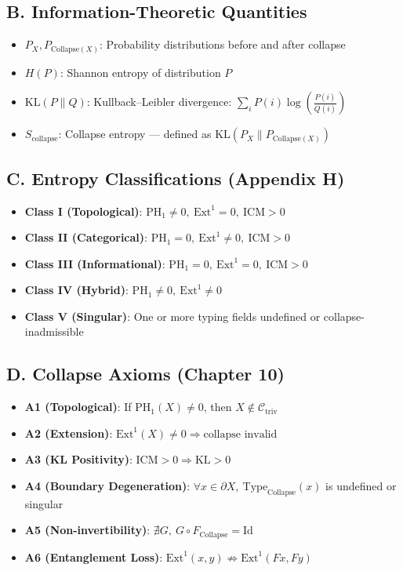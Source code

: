 \documentclass[11pt]{article}
\begin{document}
\subsection*{B. Information-Theoretic Quantities}

\begin{itemize}
  \item \( P_X, P_{\mathrm{Collapse}(X)} \): Probability distributions before and after collapse
  \item \( H(P) \): Shannon entropy of distribution \( P \)
  \item \( \mathrm{KL}(P \parallel Q) \): Kullback–Leibler divergence: \( \sum_i P(i) \log \left( \frac{P(i)}{Q(i)} \right) \)
  \item \( S_{\mathrm{collapse}} \): Collapse entropy — defined as \( \mathrm{KL}(P_X \parallel P_{\mathrm{Collapse}(X)}) \)
\end{itemize}

\subsection*{C. Entropy Classifications (Appendix H)}

\begin{itemize}
  \item \textbf{Class I (Topological)}: \( \mathrm{PH}_1 \ne 0,\ \mathrm{Ext}^1 = 0,\ \mathrm{ICM} > 0 \)
  \item \textbf{Class II (Categorical)}: \( \mathrm{PH}_1 = 0,\ \mathrm{Ext}^1 \ne 0,\ \mathrm{ICM} > 0 \)
  \item \textbf{Class III (Informational)}: \( \mathrm{PH}_1 = 0,\ \mathrm{Ext}^1 = 0,\ \mathrm{ICM} > 0 \)
  \item \textbf{Class IV (Hybrid)}: \( \mathrm{PH}_1 \ne 0,\ \mathrm{Ext}^1 \ne 0 \)
  \item \textbf{Class V (Singular)}: One or more typing fields undefined or collapse-inadmissible
\end{itemize}

\subsection*{D. Collapse Axioms (Chapter 10)}

\begin{itemize}
  \item \textbf{A1 (Topological)}: If \( \mathrm{PH}_1(X) \ne 0 \), then \( X \notin \mathcal{C}_{\mathrm{triv}} \)
  \item \textbf{A2 (Extension)}: \( \mathrm{Ext}^1(X) \ne 0 \Rightarrow \text{collapse invalid} \)
  \item \textbf{A3 (KL Positivity)}: \( \mathrm{ICM} > 0 \Rightarrow \mathrm{KL} > 0 \)
  \item \textbf{A4 (Boundary Degeneration)}: \( \forall x \in \partial X,\ \mathrm{Type}_{\mathrm{Collapse}}(x) \) is undefined or singular
  \item \textbf{A5 (Non-invertibility)}: \( \nexists G,\ G \circ F_{\mathrm{Collapse}} = \mathrm{Id} \)
  \item \textbf{A6 (Entanglement Loss)}: \( \mathrm{Ext}^1(x, y) \not\Rightarrow \mathrm{Ext}^1(Fx, Fy) \)
\end{itemize}
\end{document}
